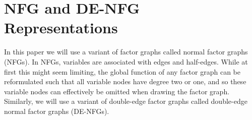 \documentclass[conference]{IEEEtran}
\theoremstyle{plain}
\theoremstyle{definition}
\begin{document}

\section{NFG and DE-NFG Representations}
\label{sec:preliminary}


In this paper we will use a variant of factor graphs called normal factor
graphs (NFGs). In NFGs, variables are associated with edges and half-edges.
While at first this might seem limiting, the global function of any factor
graph can be reformulated such that all variable nodes have degree two or one,
and so these variable nodes can effectively be omitted when drawing the factor
graph. Similarly, we will use a variant of double-edge factor graphs called
double-edge normal factor graphs (DE-NFGs).

\end{document}
